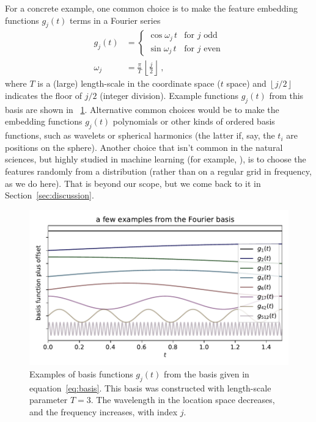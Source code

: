 \documentclass[12pt,letterpaper]{article}
\newlength{\figurewidth}
\newcommand{\floor}[1]{\left\lfloor #1 \right\rfloor}
\newcommand{\sectionname}{Section}
\begin{document}
For a concrete example, one common choice is to make the feature embedding functions $g_j(t)$ terms in a Fourier series
\begin{align}\label{eq:basis}
    g_j(t) &= \left\{\begin{array}{ll}
            \cos\omega_j\,t & \mbox{for $j$ odd} \\
            \sin\omega_j\,t & \mbox{for $j$ even}\end{array}\right.
    \\
    \omega_j &= \frac{\pi}{T}\,\floor{\frac{j}{2}}
    ~,
\end{align}
where $T$ is a (large) length-scale in the coordinate space ($t$ space) and $\floor{j/2}$ indicates the floor of $j/2$ (integer division).
Example functions $g_j(t)$ from this basis are shown in \figurename~\ref{fig:basis}.
Alternative common choices would be to make the embedding functions $g_j(t)$ polynomials or other kinds of ordered basis functions, such as wavelets or spherical harmonics (the latter if, say, the $t_i$ are positions on the sphere).
Another choice that isn't common in the natural sciences, but highly studied in machine learning (for example, \cite{rahimi2007random}), is to choose the features randomly from a distribution (rather than on a regular grid in frequency, as we do here). That is beyond our scope, but we come back to it in \sectionname~\ref{sec:discussion}.
\begin{figure}[t]
    \begin{mdframed}
    \includegraphics[width=\figurewidth]{paper/fourier.pdf}
    \caption{Examples of basis functions $g_j(t)$ from the basis given in equation~\eqref{eq:basis}. This basis was constructed with length-scale parameter $T=3$. The wavelength in the location space decreases, and the frequency increases, with index $j$.}
    \label{fig:basis}
    \end{mdframed}
\end{figure}
\end{document}
